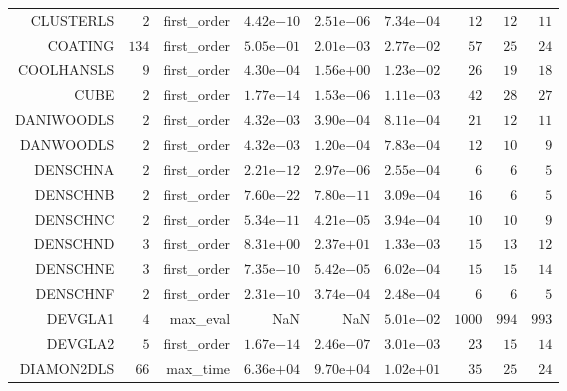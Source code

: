 \begin{longtable}{rrrrrrrrr}
CLUSTERLS & \(     2\) & first\_order & \( 4.42\)e\(-10\) & \( 2.51\)e\(-06\) & \( 7.34\)e\(-04\) & \(    12\) & \(    12\) & \(    11\) \\
COATING & \(   134\) & first\_order & \( 5.05\)e\(-01\) & \( 2.01\)e\(-03\) & \( 2.77\)e\(-02\) & \(    57\) & \(    25\) & \(    24\) \\
COOLHANSLS & \(     9\) & first\_order & \( 4.30\)e\(-04\) & \( 1.56\)e\(+00\) & \( 1.23\)e\(-02\) & \(    26\) & \(    19\) & \(    18\) \\
CUBE & \(     2\) & first\_order & \( 1.77\)e\(-14\) & \( 1.53\)e\(-06\) & \( 1.11\)e\(-03\) & \(    42\) & \(    28\) & \(    27\) \\
DANIWOODLS & \(     2\) & first\_order & \( 4.32\)e\(-03\) & \( 3.90\)e\(-04\) & \( 8.11\)e\(-04\) & \(    21\) & \(    12\) & \(    11\) \\
DANWOODLS & \(     2\) & first\_order & \( 4.32\)e\(-03\) & \( 1.20\)e\(-04\) & \( 7.83\)e\(-04\) & \(    12\) & \(    10\) & \(     9\) \\
DENSCHNA & \(     2\) & first\_order & \( 2.21\)e\(-12\) & \( 2.97\)e\(-06\) & \( 2.55\)e\(-04\) & \(     6\) & \(     6\) & \(     5\) \\
DENSCHNB & \(     2\) & first\_order & \( 7.60\)e\(-22\) & \( 7.80\)e\(-11\) & \( 3.09\)e\(-04\) & \(    16\) & \(     6\) & \(     5\) \\
DENSCHNC & \(     2\) & first\_order & \( 5.34\)e\(-11\) & \( 4.21\)e\(-05\) & \( 3.94\)e\(-04\) & \(    10\) & \(    10\) & \(     9\) \\
DENSCHND & \(     3\) & first\_order & \( 8.31\)e\(+00\) & \( 2.37\)e\(+01\) & \( 1.33\)e\(-03\) & \(    15\) & \(    13\) & \(    12\) \\
DENSCHNE & \(     3\) & first\_order & \( 7.35\)e\(-10\) & \( 5.42\)e\(-05\) & \( 6.02\)e\(-04\) & \(    15\) & \(    15\) & \(    14\) \\
DENSCHNF & \(     2\) & first\_order & \( 2.31\)e\(-10\) & \( 3.74\)e\(-04\) & \( 2.48\)e\(-04\) & \(     6\) & \(     6\) & \(     5\) \\
DEVGLA1 & \(     4\) & max\_eval &       NaN &       NaN & \( 5.01\)e\(-02\) & \(  1000\) & \(   994\) & \(   993\) \\
DEVGLA2 & \(     5\) & first\_order & \( 1.67\)e\(-14\) & \( 2.46\)e\(-07\) & \( 3.01\)e\(-03\) & \(    23\) & \(    15\) & \(    14\) \\
DIAMON2DLS & \(    66\) & max\_time & \( 6.36\)e\(+04\) & \( 9.70\)e\(+04\) & \( 1.02\)e\(+01\) & \(    35\) & \(    25\) & \(    24\) \\

\end{longtable}
